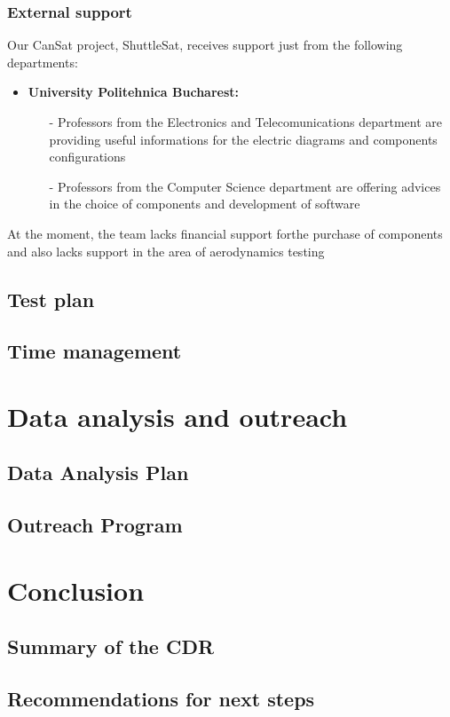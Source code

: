 \documentclass[11pt]{article}
\begin{document}
\subsubsection{External support}
Our CanSat project, ShuttleSat, receives support just from the following departments:
\begin{itemize}
\item \textbf{University Politehnica Bucharest:} 
\begin{itemize}
\item[-] Professors from the Electronics and Telecomunications department are providing useful informations for the electric diagrams and components configurations
\item[-] Professors from the Computer Science department are offering advices in the choice of components and development of software
\end{itemize}
\end{itemize}

At the moment, the team lacks financial support forthe purchase of components and also lacks support in the area of aerodynamics testing

\subsection{Test plan}

\subsection{Time management}




\section{Data analysis and outreach}

\subsection{Data Analysis Plan}

\subsection{Outreach Program}




\section{Conclusion}

\subsection{Summary of the CDR}

\subsection{Recommendations for next steps}
\end{document}
